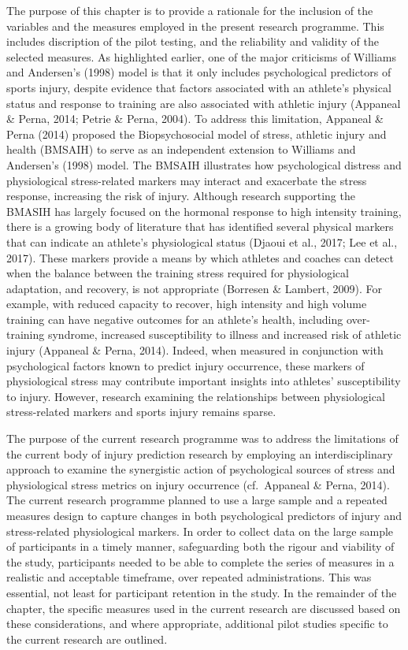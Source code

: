 \documentclass[
  english,
  man,floatsintext]{apa6}
\begin{document}
The purpose of this chapter is to provide a rationale for the inclusion of the variables and the measures employed in the present research programme.
This includes discription of the pilot testing, and the reliability and validity of the selected measures.
As highlighted earlier, one of the major criticisms of Williams and Andersen's (1998) model is that it only includes psychological predictors of sports injury, despite evidence that factors associated with an athlete's physical status and response to training are also associated with athletic injury (Appaneal \& Perna, 2014; Petrie \& Perna, 2004).
To address this limitation, Appaneal \& Perna (2014) proposed the Biopsychosocial model of stress, athletic injury and health (BMSAIH) to serve as an independent extension to Williams and Andersen's (1998) model.
The BMSAIH illustrates how psychological distress and physiological stress-related markers may interact and exacerbate the stress response, increasing the risk of injury.
Although research supporting the BMASIH has largely focused on the hormonal response to high intensity training, there is a growing body of literature that has identified several physical markers that can indicate an athlete's physiological status (Djaoui et al., 2017; Lee et al., 2017).
These markers provide a means by which athletes and coaches can detect when the balance between the training stress required for physiological adaptation, and recovery, is not appropriate (Borresen \& Lambert, 2009).
For example, with reduced capacity to recover, high intensity and high volume training can have negative outcomes for an athlete's health, including over-training syndrome, increased susceptibility to illness and increased risk of athletic injury (Appaneal \& Perna, 2014).
Indeed, when measured in conjunction with psychological factors known to predict injury occurrence, these markers of physiological stress may contribute important insights into athletes' susceptibility to injury.
However, research examining the relationships between physiological stress-related markers and sports injury remains sparse.

The purpose of the current research programme was to address the limitations of the current body of injury prediction research by employing an interdisciplinary approach to examine the synergistic action of psychological sources of stress and physiological stress metrics on injury occurrence (cf.~Appaneal \& Perna, 2014).
The current research programme planned to use a large sample and a repeated measures design to capture changes in both psychological predictors of injury and stress-related physiological markers.
In order to collect data on the large sample of participants in a timely manner, safeguarding both the rigour and viability of the study, participants needed to be able to complete the series of measures in a realistic and acceptable timeframe, over repeated administrations.
This was essential, not least for participant retention in the study.
In the remainder of the chapter, the specific measures used in the current research are discussed based on these considerations, and where appropriate, additional pilot studies specific to the current research are outlined.
\end{document}
